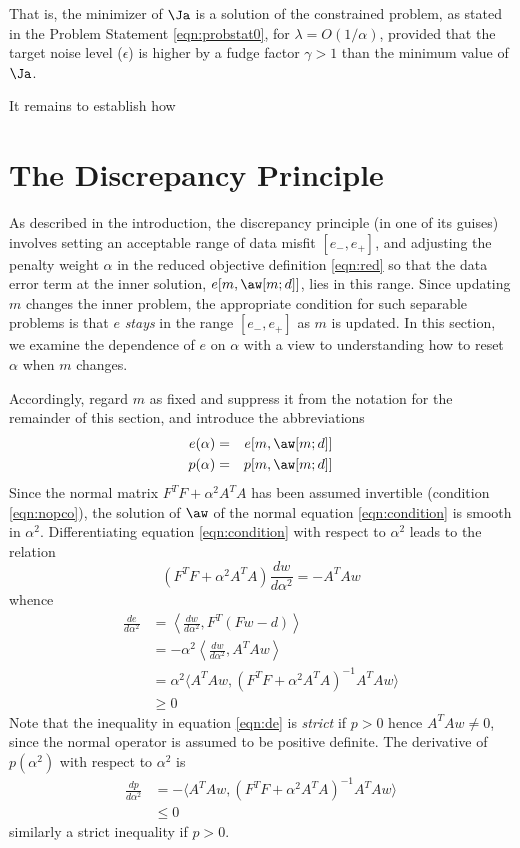 That is, the minimizer of $\Ja$ is a solution of the constrained
problem, as stated in the Problem Statement \ref{eqn:probstat0}, for
$\lambda = O(1/\alpha)$, provided that the target noise level
($\epsilon$) is higher by a fudge factor $\gamma>1$ than the minimum
value of $\Ja$.

It remains to establish how
  

\section{The Discrepancy Principle}
As described in the introduction, the discrepancy principle (in one of
its guises) involves setting an acceptable range of data misfit
$[e_-,e_+]$, and adjusting the penalty weight $\alpha$ in the reduced
objective definition \ref{eqn:red} so that the data error term at the
inner solution, $e[m,\aw[m;d]]$, lies in this range. Since updating
$m$ changes the inner problem, the appropriate condition for such
separable problems is that $e$ {\em stays} in the range $[e_-,e_+]$ as
$m$ is updated. In this section, we examine the dependence of $e$
on $\alpha$ with a view to understanding how to reset $\alpha$ when
$m$ changes.

Accordingly, regard $m$ as fixed and suppress it from the notation for the remainder of this section, and introduce the abbreviations
\begin{eqnarray}
\label{eqn:erralph}
e(\alpha) &=& e[m,\aw[m;d]]\\
\label{eqn:penalph}
p(\alpha) &=& p[m,\aw[m;d]]
\end{eqnarray}
Since the normal matrix $F^T F + \alpha^2 A^T A$ has been assumed
invertible (condition \ref{eqn:nopco}), the solution of $\aw$ of the
normal equation \ref{eqn:condition} is smooth in $\alpha^2$.
Differentiating equation \ref{eqn:condition} with respect to  $\alpha^2$ leads to the relation
\begin{equation}
(F^T F + \alpha^2 A^T A ) \frac{dw}{d\alpha^2} = -A^T A w
\label{eqn:dnorm}
\end{equation}
whence
\begin{align}
\frac{de}{d\alpha^2} 
&=\left\langle\frac{dw}{d\alpha^2},F^T(Fw-d) \right\rangle \nonumber \\
&=-\alpha^2\left\langle\frac{dw}{d\alpha^2},A^TAw\right\rangle \nonumber \\ 
&=\alpha^2 \langle A^TAw,(F^TF + \alpha^2 A^TA)^{-1}A^TAw\rangle \nonumber \\
&\ge 0
\label{eqn:de}
\end{align}
Note that the inequality in equation \ref{eqn:de} is {\em strict}  if $p > 0$ hence $A^TAw \ne 0$, since the normal operator is assumed to be positive definite.
The derivative of $p(\alpha^2)$ with respect to $\alpha^2$ is
\begin{align}
\frac{dp}{d\alpha^2} &=  -\langle A^T Aw,(F^TF + \alpha^2 A^TA)^{-1}A^TAw \rangle \nonumber \\
&\leq 0
\label{eqn:dp}
\end{align}
similarly a strict inequality if $p > 0$.

